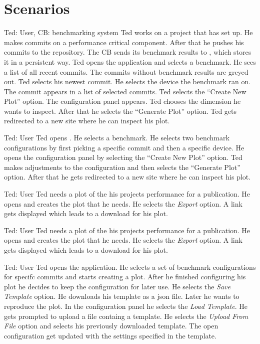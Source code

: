 \section{Scenarios}

{Ted: User, CB: \Gls{benchmarking system}}
{Ted works on a project that has \parkview{} set up. He makes commits on a performance critical component. After that he pushes his commits to the repository. The CB sends its \glspl{benchmark result} to \parkview{}, which stores it in a persistent way. Ted opens the application and selects a \gls{benchmark}. He sees a list of all recent commits. The commits without \glspl{benchmark result} are greyed out. Ted selects his newest commit. He selects the device the \gls{benchmark} ran on. The commit appears in a list of selected commits. Ted selects the \enquote{Create New Plot} option. The configuration panel appears. Ted chooses the dimension he wants to inspect. After that he selects the \enquote{Generate Plot} option. Ted gets redirected to a new site where he can inspect his \gls{plot}.} 

{Ted: User}
{Ted opens \parkview{}. He selects a \gls{benchmark}. He selects two \glspl{benchmark configuration} by first picking a specific commit and then a specific device. He opens the configuration panel by selecting the \enquote{Create New Plot} option. Ted makes adjustments to the \gls{configuration} and then selects the \enquote{Generate Plot} option. After that he gets redirected to a new site where he can inspect his \gls{plot}.}

{Ted: User}
{Ted needs a \gls{plot} of the his projects performance for a publication. He opens \parkview{} and creates the plot that he needs. He selects the \emph{Export} option. A link gets displayed which leads to a download for his \gls{plot}.}

{Ted: User}
{Ted needs a \gls{plot} of the his projects performance for a publication. He opens \parkview{} and creates the plot that he needs. He selects the \emph{Export} option. A link gets displayed which leads to a download for his \gls{plot}.}

{Ted: User}
{Ted opens the application. He selects a set of \glspl{benchmark configuration} for specifc commits and starts creating a \gls{plot}. After he finished configuring his \gls{plot} he decides to keep the \gls{configuration} for later use. He selects the \emph{Save Template} option. He downloads his template as a \gls{json} file. Later he wants to reproduce the \gls{plot}. In the configuration panel he selects the \emph{Load Template}. He gets prompted to upload a file containg a \gls{template}. He selects the \emph{Upload From File} option and selects his previously downloaded \gls{template}. The open \gls{configuration} get updated with the settings specified in the \gls{template}.}


